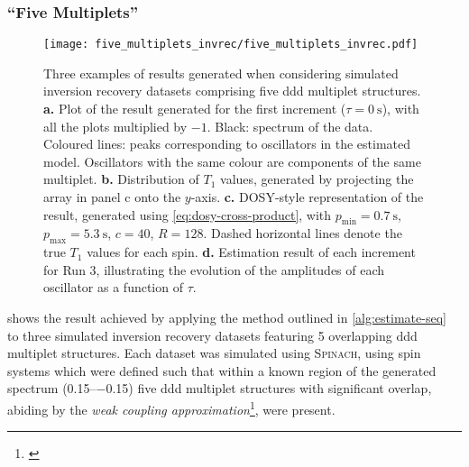 \subsubsection{``Five Multiplets''}
\begin{figure}
    \vspace{-10pt}
    \texttt{[image: five\_multiplets\_invrec/five\_multiplets\_invrec.pdf]}
    \caption[
        Three examples of results generated when considering simulated
        inversion recovery datasets comprising five ddd multiplet structures.
    ]
    {
        Three examples of results generated when considering
        simulated inversion recovery datasets comprising five ddd multiplet
        structures.
        \textbf{a.} Plot of the result generated for the first increment ($\tau
        = \qty{0}{\second}$), with all the plots multiplied by $-1$. Black:
        spectrum of the data. Coloured lines: peaks corresponding to
        oscillators in the estimated model. Oscillators with the same colour
        are components of the same multiplet.
        \textbf{b.} Distribution of $T_1$ values, generated
        by projecting the array in panel c onto the $y$-axis.
        \textbf{c.} \ac{DOSY}-style representation of the result, generated using
        \cref{eq:dosy-cross-product},
        with
        $p_{\text{min}} = \qty{0.7}{\second}$,
        $p_{\text{max}} = \qty{5.3}{\second}$,
        $c = 40$,
        $R=128$.
        Dashed horizontal lines denote the true $T_1$ values for each spin.
        \textbf{d.} Estimation result of each increment for Run 3,
        illustrating the evolution of the amplitudes of each oscillator as a
        function of $\tau$.
    }
    \label{fig:five-multiplets-invrec}
\end{figure}
 shows the result achieved by applying the
method outlined in \cref{alg:estimate-seq}
to three simulated inversion recovery datasets featuring 5 overlapping ddd
multiplet structures.
Each dataset was simulated using \textsc{Spinach}, using spin systems which
were defined such that within a
known region of the generated spectrum
(\SIrange{0.15}{-0.15}{\partspermillion}) five ddd
multiplet structures with significant overlap, abiding by the
\emph{weak coupling approximation}\footnote{
    \label{fn:weak-coupling}
}, were present.
